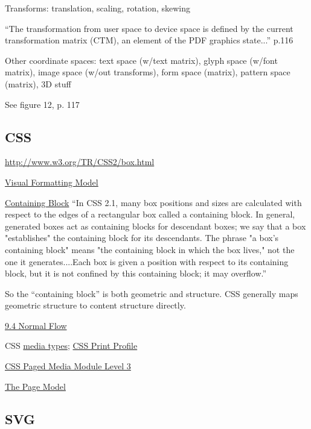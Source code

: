 \documentclass[12pt]{tufte-handout}
\numberwithin{equation}{subsection}
\numberwithin{equation}{subsection}
\begin{document}
{\begin{appendices}
    Transforms: translation, scaling, rotation, skewing


    ``The transformation from user space to device space is defined by the current transformation matrix (CTM), an element of the PDF graphics state...'' p.116

    Other coordinate spaces: text space (w/text matrix), glyph space
    (w/font matrix), image space (w/out transforms), form space (matrix),
    pattern space (matrix), 3D stuff

    See figure 12, p. 117

    \subsection{CSS}

    \url{http://www.w3.org/TR/CSS2/box.html}

    \href{http://www.w3.org/TR/CSS2/visuren.html}{Visual Formatting Model}

    \href{http://www.w3.org/TR/CSS2/visuren.html#containing-block}{Containing
      Block} ``In CSS 2.1, many box positions and sizes are calculated
    with respect to the edges of a rectangular box called a containing
    block. In general, generated boxes act as containing blocks for
    descendant boxes; we say that a box "establishes" the containing block
    for its descendants. The phrase "a box's containing block" means "the
    containing block in which the box lives," not the one it
    generates....Each box is given a position with respect to its
    containing block, but it is not confined by this containing block; it
    may overflow.''

    So the ``containing block'' is both geometric and structure.  CSS
    generally maps geometric structure to content structure directly.

    \href{http://www.w3.org/TR/CSS2/visuren.html#normal-flow}{9.4 Normal Flow}

    CSS \href{http://www.w3.org/TR/CSS2/media.html}{media types}; \href{http://www.w3.org/TR/css-print/}{CSS Print Profile}

    \href{http://www.w3.org/TR/css3-page/}{CSS Paged Media Module Level 3}

    \href{http://www.w3.org/TR/css3-page/#page-model}{The Page Model}

    \subsection{SVG}


\end{appendices}}
\end{document}
